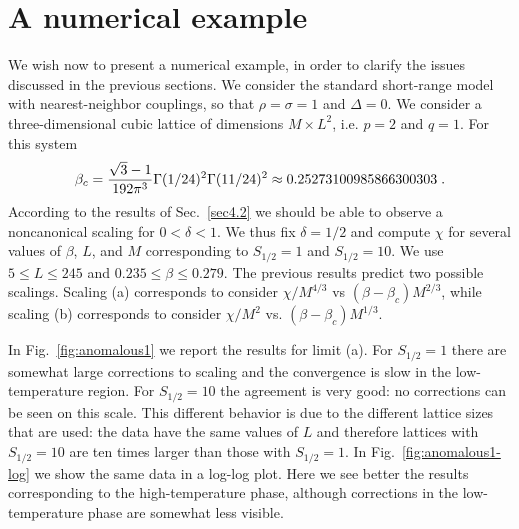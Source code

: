 \documentclass[a4paper,12pt]{article}
\begin{document}
\section{A numerical example} \label{sec5}

We wish now to present a numerical example, in order to clarify the 
issues discussed in the previous sections. We consider the standard 
short-range model with nearest-neighbor couplings, so that 
$\rho = \sigma = 1$ and $\Delta = 0$. We consider a three-dimensional 
cubic lattice of dimensions $M\times L^2$, i.e. $p=2$ and $q=1$. For this
system \cite{BZ-92}
\begin{equation}
\beta_c = {\sqrt{3} - 1\over 192 \pi^3} 
      \Gamma(1/24)^2 \Gamma(11/24)^2 \approx 
      0.25273100985866300303\; .
\end{equation}
According to the results of Sec.~\ref{sec4.2} we should be able to observe 
a noncanonical scaling for $0 < \delta < 1$. We thus fix $\delta = 1/2$
and compute $\chi$ for several values of $\beta$, $L$, and $M$ 
corresponding to $S_{1/2} = 1$ and $S_{1/2} = 10$. We use 
$5 \le L \le 245$ and $0.235 \le \beta \le 0.279$. 
The previous results predict two possible scalings. Scaling (a)
corresponds to consider $\chi/M^{4/3}$ vs $(\beta - \beta_c) M^{2/3}$, 
while scaling (b) corresponds to consider $\chi/M^{2}$ 
vs. $(\beta - \beta_c) M^{1/3}$. 

In Fig.~\ref{fig:anomalous1} we report the results for limit (a). 
For $S_{1/2} = 1$ there are somewhat large corrections to scaling 
and the convergence is slow in the low-temperature region. 
For $S_{1/2} = 10$ the agreement is very good: no corrections can be seen 
on this scale. This different behavior is due to the different lattice sizes 
that are used: the data have the same values of $L$ and therefore 
lattices with $S_{1/2} = 10$ are ten times larger than those with 
$S_{1/2} = 1$. In Fig.~\ref{fig:anomalous1-log} we show the same data 
in a log-log plot. Here we see better the results corresponding to
the high-temperature phase, although corrections in the low-temperature
phase are somewhat less visible.
\end{document}
